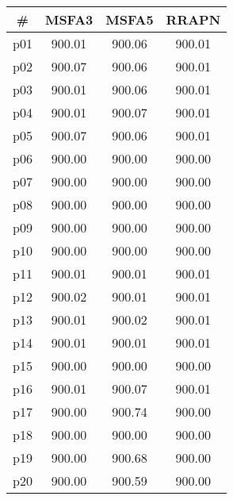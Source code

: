 \begin{tabular}{c||c|c|c}
\textbf{\#} & \textbf{MSFA3} & \textbf{MSFA5} & \textbf{RRAPN}\\
\hline
\hline
p01 & 900.01 & 900.06 & 900.01\\
p02 & 900.07 & 900.06 & 900.01\\
p03 & 900.01 & 900.06 & 900.01\\
p04 & 900.01 & 900.07 & 900.01\\
p05 & 900.07 & 900.06 & 900.01\\
p06 & 900.00 & 900.00 & 900.00\\
p07 & 900.00 & 900.00 & 900.00\\
p08 & 900.00 & 900.00 & 900.00\\
p09 & 900.00 & 900.00 & 900.00\\
p10 & 900.00 & 900.00 & 900.00\\
p11 & 900.01 & 900.01 & 900.01\\
p12 & 900.02 & 900.01 & 900.01\\
p13 & 900.01 & 900.02 & 900.01\\
p14 & 900.01 & 900.01 & 900.01\\
p15 & 900.00 & 900.00 & 900.00\\
p16 & 900.01 & 900.07 & 900.01\\
p17 & 900.00 & 900.74 & 900.00\\
p18 & 900.00 & 900.00 & 900.00\\
p19 & 900.00 & 900.68 & 900.00\\
p20 & 900.00 & 900.59 & 900.00\\
\end{tabular}

